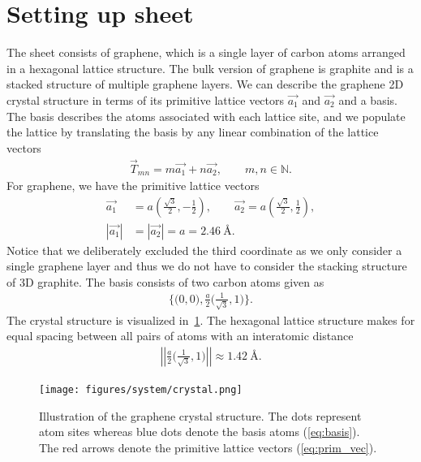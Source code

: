 \section{Setting up sheet}
The sheet consists of graphene, which is a single layer of carbon atoms arranged in a hexagonal lattice structure. The bulk version of graphene is graphite and is a stacked structure of multiple graphene layers. We can describe the graphene 2D crystal structure in terms of its primitive lattice vectors $\vec{a_1}$ and $\vec{a_2}$ and a basis. The basis describes the atoms associated with each lattice site, and we populate the lattice by translating the basis by any linear combination of the lattice vectors 
\begin{align*}
  \vec{T}_{mn} = m\vec{a_1} + n\vec{a_2}, \qquad m,n \in \mathbb{N}.
\end{align*}
For graphene, we have the primitive lattice vectors~\cite{gray2009crystal} 
\begin{align}
  \vec{a_1} &= a \left(\frac{\sqrt{3}}{2}, -\frac{1}{2}\right), \qquad \vec{a_2} = a \left(\frac{\sqrt{3}}{2}, \frac{1}{2}\right), \label{eq:prim_vec} \\
  |\vec{a_1}| &= |\vec{a_2}| = a = 2.46 \ \text{Å}. \nonumber
\end{align}
Notice that we deliberately excluded the third coordinate as we only consider a
single graphene layer and thus we do not have to consider the stacking structure of 3D graphite. The basis consists of two carbon atoms given as 
\begin{align}
  \Big\{\Big(0,0\Big), \frac{a}{2}\Big(\frac{1}{\sqrt{3}}, 1 \Big) \Big\}.
  \label{eq:basis}
\end{align}
The crystal structure is visualized in~\cref{fig:graphene_crystal}. The hexagonal lattice structure makes for equal spacing between all pairs of atoms with an interatomic distance
\begin{align*}
  \left|\left|\frac{a}{2}\Big(\frac{1}{\sqrt{3}}, 1 \Big)\right|\right| \approx 1.42 \ \text{Å}.
\end{align*}
  
\begin{figure}[!htb]
  \centering
  \texttt{[image: figures/system/crystal.png]}
  \caption{Illustration of the graphene crystal structure. The dots represent atom sites whereas blue dots denote the basis atoms (\cref{eq:basis}). The red arrows denote the primitive lattice vectors (\cref{eq:prim_vec}). }
  \label{fig:graphene_crystal}
\end{figure}
  
